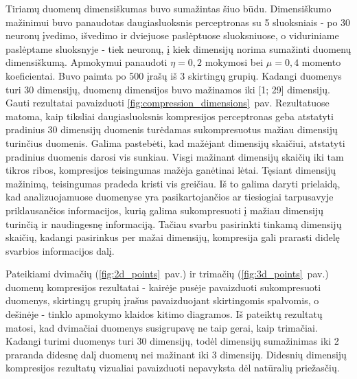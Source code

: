 \documentclass{VUMIFPSbakalaurinis}
\begin{document}
Tiriamų duomenų dimensiškumas buvo sumažintas šiuo būdu.
Dimensiškumo mažinimui buvo panaudotas daugiasluoksnis perceptronas su 5 sluoksniais - po 30 neuronų įvedimo, išvedimo ir dviejuose paslėptuose sluoksniuose, o viduriniame paslėptame sluoksnyje - tiek neuronų, į kiek dimensijų norima sumažinti duomenų dimensiškumą.
Apmokymui panaudoti $\eta = 0,2$ mokymosi bei $\mu = 0,4$ momento koeficientai.
Buvo paimta po 500 įrašų iš 3 skirtingų grupių.
Kadangi duomenys turi 30 dimensijų, duomenų dimensijos buvo mažinamos iki [1; 29] dimensijų.
Gauti rezultatai pavaizduoti \ref{fig:compression_dimensions}~pav.
Rezultatuose matoma, kaip tiksliai daugiasluoksnis kompresijos perceptronas geba atstatyti pradinius 30 dimensijų duomenis turėdamas sukompresuotus mažiau dimensijų turinčius duomenis.
Galima pastebėti, kad mažėjant dimensijų skaičiui, atstatyti pradinius duomenis darosi vis sunkiau.
Visgi mažinant dimensijų skaičių iki tam tikros ribos, kompresijos teisingumas mažėja ganėtinai lėtai.
Tęsiant dimensijų mažinimą, teisingumas pradeda kristi vis greičiau.
Iš to galima daryti prielaidą, kad analizuojamuose duomenyse yra pasikartojančios ar tiesiogiai tarpusavyje priklausančios informacijos, kurią galima sukompresuoti į mažiau dimensijų turinčią ir naudingesnę informaciją.
Tačiau svarbu pasirinkti tinkamą dimensijų skaičių, kadangi pasirinkus per mažai dimensijų, kompresija gali prarasti didelę svarbios informacijos dalį.

Pateikiami dvimačių (\ref{fig:2d_points}~pav.) ir trimačių (\ref{fig:3d_points}~pav.) duomenų kompresijos rezultatai - kairėje pusėje pavaizduoti sukompresuoti duomenys, skirtingų grupių įrašus pavaizduojant skirtingomis spalvomis, o dešinėje - tinklo apmokymo klaidos kitimo diagramos.
Iš pateiktų rezultatų matosi, kad dvimačiai duomenys susigrupavę ne taip gerai, kaip trimačiai.
Kadangi turimi duomenys turi 30 dimensijų, todėl dimensijų sumažinimas iki 2 praranda didesnę dalį duomenų nei mažinant iki 3 dimensijų.
Didesnių dimensijų kompresijos rezultatų vizualiai pavaizduoti nepavyksta dėl natūralių priežasčių.
\end{document}

